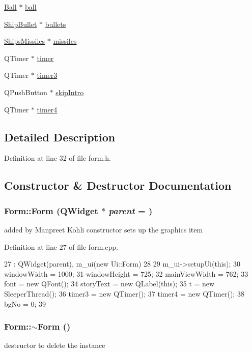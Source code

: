 \begin{DoxyCompactItemize}
\hyperlink{class_ball}{Ball} $\ast$ \hyperlink{class_form_a0e07a371edadd1e19a9e32114a16aa08}{ball}
\item 
\hyperlink{class_ship_bullet}{ShipBullet} $\ast$ \hyperlink{class_form_a19e48881d7309cc448166ecde55e1850}{bullets}
\item 
\hyperlink{class_ships_missiles}{ShipsMissiles} $\ast$ \hyperlink{class_form_ad2c32c2f532f56f4e3cb5945b8083cf0}{missiles}
\item 
QTimer $\ast$ \hyperlink{class_form_a07118dfb7566e4baf43c182ecd378481}{timer}
\item 
QTimer $\ast$ \hyperlink{class_form_a9ef80826774356f54f6d056ef48cce52}{timer3}
\item 
QPushButton $\ast$ \hyperlink{class_form_af12436143c1da6a3a491fa941aa8924b}{skipIntro}
\item 
QTimer $\ast$ \hyperlink{class_form_a9c2c8ccb519f3ad5af95b8f6a47b8c85}{timer4}
\end{DoxyCompactItemize}


\subsection{Detailed Description}


Definition at line 32 of file form.h.

\subsection{Constructor \& Destructor Documentation}
\hypertarget{class_form_a9a921e26a02f23bffdea4330d6795796}{
\subsubsection[{Form}]{\setlength{\rightskip}{0pt plus 5cm}Form::Form (QWidget $\ast$ {\em parent} = {})}}
\label{class_form_a9a921e26a02f23bffdea4330d6795796}
added by Manpreet Kohli constructor sets up the graphics item 

Definition at line 27 of file form.cpp.


\begin{DoxyCode}
27                           :  QWidget(parent), m_ui(new Ui::Form)
28 {
29     m_ui->setupUi(this);
30     windowWidth = 1000;
31     windowHeight = 725;
32     mainViewWidth = 762;
33     font = new QFont();
34     storyText = new QLabel(this);
35     t = new SleeperThread();
36     timer3 = new QTimer();
37     timer4 = new QTimer();
38     bgNo = 0;
39 }
\end{DoxyCode}
\hypertarget{class_form_a9cda7cce41e81bfaca51e922d4f9b98f}{
\subsubsection[{$\sim$Form}]{\setlength{\rightskip}{0pt plus 5cm}Form::$\sim$Form ()}}
\label{class_form_a9cda7cce41e81bfaca51e922d4f9b98f}
destructor to delete the instance 

